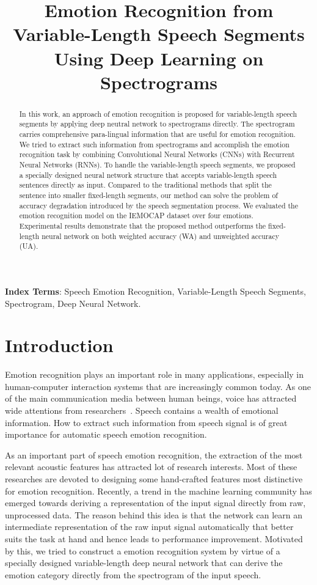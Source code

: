 \documentclass[a4paper]{article}
\title{Emotion Recognition from Variable-Length Speech Segments Using Deep Learning on Spectrograms}
\begin{document}
\maketitle
%
\begin{abstract}
In this work, an approach of emotion recognition is proposed for variable-length speech segments by applying deep neutral network to spectrograms directly. The spectrogram carries comprehensive para-lingual information that are useful for emotion recognition. We tried to extract such information from spectrograms and accomplish the emotion recognition task by combining Convolutional Neural Networks (CNNs) with Recurrent Neural Networks (RNNs). To handle the variable-length speech segments, we proposed a specially designed neural network structure that accepts variable-length speech sentences directly as input. Compared to the traditional methods that split the sentence into smaller fixed-length segments, our method can solve the problem of accuracy degradation introduced by the speech segmentation process. We evaluated the emotion recognition model on the IEMOCAP dataset over four emotions. Experimental results demonstrate that the proposed method outperforms the fixed-length neural network on both weighted accuracy (WA) and unweighted accuracy (UA).
\end{abstract}

\noindent\textbf{Index Terms}: Speech Emotion Recognition, Variable-Length Speech Segments, Spectrogram, Deep Neural Network.

\section{Introduction}

Emotion recognition plays an important role in many applications, especially in human-computer interaction systems that are increasingly common today. As one of the main communication media between human beings, voice has attracted wide attentions from researchers~\cite{ayadi2011}. Speech contains a wealth of emotional information. How to extract such information from speech signal is of great importance for automatic speech emotion recognition.

As an important part of speech emotion recognition, the extraction of the most relevant acoustic features has attracted lot of research interests. Most of these researches are devoted to designing some hand-crafted features most distinctive for emotion recognition. Recently, a trend in the machine learning community has emerged towards deriving a representation of the input signal directly from raw, unprocessed data. The reason behind this idea is that the network can learn an intermediate representation of the raw input signal automatically that better suits the task at hand and hence leads to performance improvement. Motivated by this, we tried to construct a emotion recognition system by virtue of a specially designed variable-length deep neural network that can derive the emotion category directly from the spectrogram of the input speech.
\end{document}
